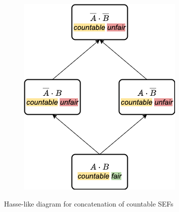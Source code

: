 \begin{appendices}
  \begin{figure}[h!]
    \centering
    \begin{subfigure}[b]{0.5\linewidth}
      \includegraphics[width=\linewidth]{appendix/concat-hasse-countable.png}
    \end{subfigure}
    \caption{Hasse-like diagram for concatenation of countable SEFs}
    \label{fig:concatcount}
  \end{figure}

  \pagebreak

\end{appendices}
